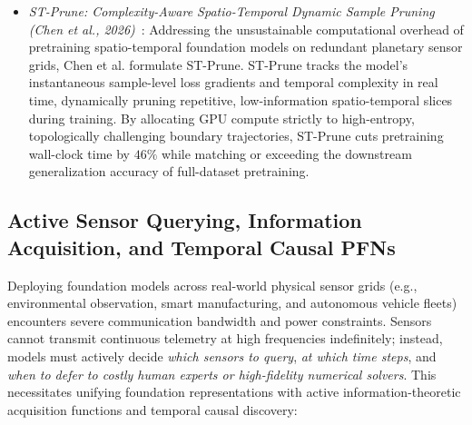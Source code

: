 \begin{itemize}[leftmargin=*]
    \item \emph{ST-Prune: Complexity-Aware Spatio-Temporal Dynamic Sample Pruning (Chen et al., 2026)}~\cite{chen2026stprune}: Addressing the unsustainable computational overhead of pretraining spatio-temporal foundation models on redundant planetary sensor grids, Chen et al. formulate ST-Prune. ST-Prune tracks the model's instantaneous sample-level loss gradients and temporal complexity in real time, dynamically pruning repetitive, low-information spatio-temporal slices during training. By allocating GPU compute strictly to high-entropy, topologically challenging boundary trajectories, ST-Prune cuts pretraining wall-clock time by $46\%$ while matching or exceeding the downstream generalization accuracy of full-dataset pretraining.
\end{itemize}

\subsection{Active Sensor Querying, Information Acquisition, and Temporal Causal PFNs}
\label{sec:active_sensing_causal_pfns}

Deploying foundation models across real-world physical sensor grids (e.g., environmental observation, smart manufacturing, and autonomous vehicle fleets) encounters severe communication bandwidth and power constraints. Sensors cannot transmit continuous telemetry at high frequencies indefinitely; instead, models must actively decide \emph{which sensors to query}, \emph{at which time steps}, and \emph{when to defer to costly human experts or high-fidelity numerical solvers}. This necessitates unifying foundation representations with active information-theoretic acquisition functions and temporal causal discovery:

